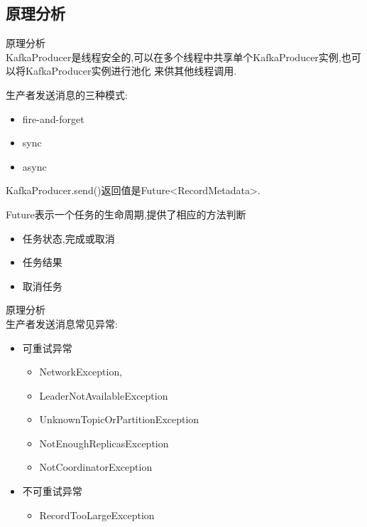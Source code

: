 \subsection{原理分析}
\begin{frame}[plain,t]{原理分析} %
	 \\ 
	 \vspace{2ex}
	KafkaProducer是线程安全的,可以在多个线程中共享单个KafkaProducer实例,也可以将KafkaProducer实例进行池化
	来供其他线程调用.
	
	 \vspace{1ex}
	 生产者发送消息的三种模式:
	 \begin{itemize}
	 	\item fire-and-forget
	 	\item sync
	 	\item async
	 \end{itemize}
 
 KafkaProducer.send()返回值是Future<RecordMetadata>.
 
 Future表示一个任务的生命周期,提供了相应的方法判断
  \begin{itemize}
 	\item 任务状态,完成或取消
 	\item 任务结果
 	\item 取消任务
 \end{itemize}

\end{frame}
\begin{frame}[plain,t]{原理分析} %
 \\  \vspace{2ex}
	 生产者发送消息常见异常:
	  \vspace{1ex}
	 \begin{itemize}
	 	\item 可重试异常
	 	 \begin{itemize}
	 		\item NetworkException,
	 		\item LeaderNotAvailableException
	 		\item UnknownTopicOrPartitionException
	 		\item NotEnoughReplicasException
	 		\item NotCoordinatorException
	 	\end{itemize}
	 	\item 不可重试异常
	 	 \begin{itemize}
	 		\item RecordTooLargeException
	 	\end{itemize}
	 \end{itemize}
 
 
	 
	

\end{frame}
